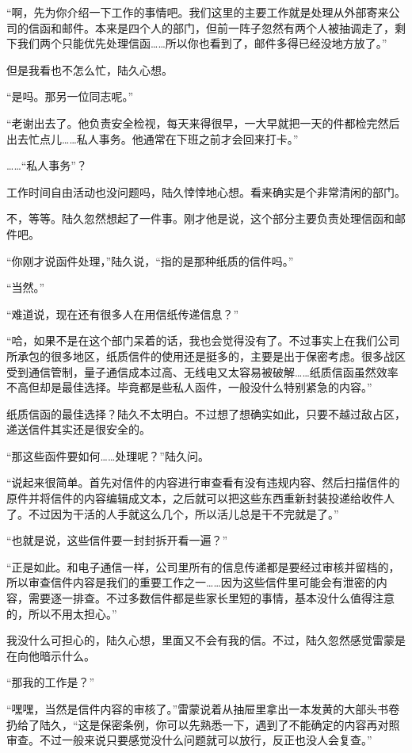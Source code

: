 “啊，先为你介绍一下工作的事情吧。我们这里的主要工作就是处理从外部寄来公司的信函和邮件。本来是四个人的部门，但前一阵子忽然有两个人被抽调走了，剩下我们两个只能优先处理信函……所以你也看到了，邮件多得已经没地方放了。”

但是我看也不怎么忙，陆久心想。

“是吗。那另一位同志呢。”

“老谢出去了。他负责安全检视，每天来得很早，一大早就把一天的件都检完然后出去忙点儿……私人事务。他通常在下班之前才会回来打卡。”

……“私人事务”？

工作时间自由活动也没问题吗，陆久悻悻地心想。看来确实是个非常清闲的部门。

不，等等。陆久忽然想起了一件事。刚才他是说，这个部分主要负责处理信函和邮件吧。

“你刚才说函件处理，”陆久说，“指的是那种纸质的信件吗。”

“当然。”

“难道说，现在还有很多人在用信纸传递信息？”

“哈，如果不是在这个部门呆着的话，我也会觉得没有了。不过事实上在我们公司所承包的很多地区，纸质信件的使用还是挺多的，主要是出于保密考虑。很多战区受到通信管制，量子通信成本过高、无线电又太容易被破解……纸质信函虽然效率不高但却是最佳选择。毕竟都是些私人函件，一般没什么特别紧急的内容。”

纸质信函的最佳选择？陆久不太明白。不过想了想确实如此，只要不越过敌占区，递送信件其实还是很安全的。

“那这些函件要如何……处理呢？”陆久问。

“说起来很简单。首先对信件的内容进行审查看有没有违规内容、然后扫描信件的原件并将信件的内容编辑成文本，之后就可以把这些东西重新封装投递给收件人了。不过因为干活的人手就这么几个，所以活儿总是干不完就是了。”

“也就是说，这些信件要一封封拆开看一遍？”

“正是如此。和电子通信一样，公司里所有的信息传递都是要经过审核并留档的，所以审查信件内容是我们的重要工作之一……因为这些信件里可能会有泄密的内容，需要逐一排查。不过多数信件都是些家长里短的事情，基本没什么值得注意的，所以不用太担心。”

我没什么可担心的，陆久心想，里面又不会有我的信。不过，陆久忽然感觉雷蒙是在向他暗示什么。

“那我的工作是？”

“嘿嘿，当然是信件内容的审核了。”雷蒙说着从抽屉里拿出一本发黄的大部头书卷扔给了陆久，“这是保密条例，你可以先熟悉一下，遇到了不能确定的内容再对照审查。不过一般来说只要感觉没什么问题就可以放行，反正也没人会复查。”

